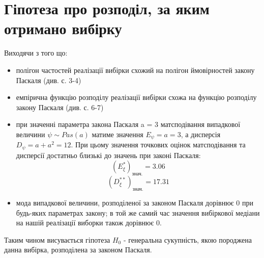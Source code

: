 \documentclass{article}
\begin{document}
\section{Гіпотеза про розподіл, за яким отримано вибірку}
Виходячи з того що:
\begin{itemize}
  \item полігон частостей реалізації вибірки схожий на полігон 
  ймовірностей закону Паскаля (див. с. 3-4)
  \item емпірична функцію розподілу реалізації вибірки схожа на
  функцію розподілу закону Паскаля (див. с. 6-7)
  \item при значенні параметра закона Паскаля a = 3 матсподівання 
  випадкової величини $\psi \sim Pas(a)$
  матиме значення $E_\psi = a = 3$, а дисперсія $D_\psi = a + a^2 
  = 12$. При цьому значення точкових оцінок матсподівання та дисперсії достатньо 
  близькі до значень при законі Паскаля:
  $$(E^*_{\xi})_{\text{знач.}} = 3.06$$
  $$(D^{**}_\xi)_\text{знач.} = 17.31$$
  \item мода випадкової величини, розподіленої за законом Паскаля
  дорівнює 0 при будь-яких параметрах закону; в той же самий час 
  значення вибіркової медіани на нашій реалізації виборки також
  дорівнює 0.
\end{itemize}
Таким чином висувається гіпотеза $H_0$ - генеральна сукупність, 
якою породжена данна вибірка, розподілена за законом Паскаля.
\newpage
\end{document}
